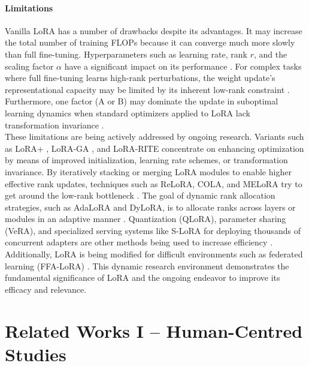 \documentclass{DESSThesis}
\begin{document}
\subsubsection{Limitations}
Vanilla LoRA has a number of drawbacks despite its advantages. It may increase the total number of training FLOPs \cite{wang_lora-ga_2024,biderman_lora_2024} because it can converge much more slowly than full fine-tuning. Hyperparameters such as learning rate, rank $r$, and the scaling factor $\alpha$ have a significant impact on its performance \cite{biderman_lora_2024,lialin_scaling_2023}. For complex tasks where full fine-tuning learns high-rank perturbations, the weight update's representational capacity may be limited by its inherent low-rank constraint \cite{biderman_lora_2024,hao_flora_2024,mao_survey_2025}. Furthermore, one factor (A or B) may dominate the update in suboptimal learning dynamics when standard optimizers applied to LoRA lack transformation invariance \cite{yen_lora_2024,hayou_lora_2024}.
\\
These limitations are being actively addressed by ongoing research. Variants such as LoRA+ \cite{hayou_lora_2024}, LoRA-GA \cite{wang_lora-ga_2024}, and LoRA-RITE \cite{yen_lora_2024} concentrate on enhancing optimization by means of improved initialization, learning rate schemes, or transformation invariance. By iteratively stacking or merging LoRA modules to enable higher effective rank updates, techniques such as ReLoRA, COLA, and MELoRA try to get around the low-rank bottleneck \cite{mao_survey_2025}. The goal of dynamic rank allocation strategies, such as AdaLoRA and DyLoRA, is to allocate ranks across layers or modules in an adaptive manner \cite{mao_editing_2024}. Quantization (QLoRA), parameter sharing (VeRA), and specialized serving systems like S-LoRA for deploying thousands of concurrent adapters are other methods being used to increase efficiency \cite{mao_survey_2025}. Additionally, LoRA is being modified for difficult environments such as federated learning (FFA-LoRA) \cite{sun_improving_2024}. This dynamic research environment demonstrates the fundamental significance of LoRA and the ongoing endeavor to improve its efficacy and relevance.


\chapter{Related Works I – Human-Centred Studies}
\thispagestyle{empty}
\end{document}

